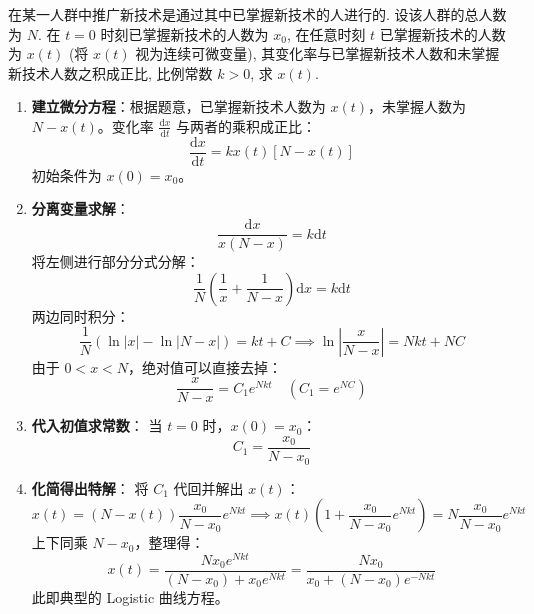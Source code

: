 \documentclass[lang=cn,11pt]{elegantbook}
\begin{document}
\begin{exercise}
在某一人群中推广新技术是通过其中已掌握新技术的人进行的. 设该人群的总人数为 $N$. 在 $t=0$ 时刻已掌握新技术的人数为 $x_0$, 在任意时刻 $t$ 已掌握新技术的人数为 $x(t)$ (将 $x(t)$ 视为连续可微变量), 其变化率与已掌握新技术人数和未掌握新技术人数之积成正比, 比例常数 $k>0$, 求 $x(t)$.
\end{exercise}
\begin{solution}
\begin{enumerate}
    \item \textbf{建立微分方程}：根据题意，已掌握新技术人数为 $x(t)$，未掌握人数为 $N - x(t)$。变化率 $\frac{\mathrm{d}x}{\mathrm{d}t}$ 与两者的乘积成正比：
    \[
    \frac{\mathrm{d}x}{\mathrm{d}t} = k x(t) [N - x(t)]
    \]
    初始条件为 $x(0) = x_0$。
    
    \item \textbf{分离变量求解}：
    \[
    \frac{\mathrm{d}x}{x(N-x)} = k \mathrm{d}t
    \]
    将左侧进行部分分式分解：
    \[
    \frac{1}{N} \left( \frac{1}{x} + \frac{1}{N-x} \right) \mathrm{d}x = k \mathrm{d}t
    \]
    两边同时积分：
    \[
    \frac{1}{N} \left( \ln|x| - \ln|N-x| \right) = kt + C \implies \ln \left| \frac{x}{N-x} \right| = Nkt + NC
    \]
    由于 $0 < x < N$，绝对值可以直接去掉：
    \[
    \frac{x}{N-x} = C_1 e^{Nkt} \quad (C_1 = e^{NC})
    \]
    
    \item \textbf{代入初值求常数}：
    当 $t=0$ 时，$x(0) = x_0$：
    \[
    C_1 = \frac{x_0}{N-x_0}
    \]
    
    \item \textbf{化简得出特解}：
    将 $C_1$ 代回并解出 $x(t)$：
    \[
    x(t) = (N-x(t)) \frac{x_0}{N-x_0} e^{Nkt} \implies x(t) \left( 1 + \frac{x_0}{N-x_0} e^{Nkt} \right) = N \frac{x_0}{N-x_0} e^{Nkt}
    \]
    上下同乘 $N-x_0$，整理得：
    \[
    x(t) = \frac{N x_0 e^{Nkt}}{(N-x_0) + x_0 e^{Nkt}} = \frac{N x_0}{x_0 + (N-x_0)e^{-Nkt}}
    \]
    此即典型的 Logistic 曲线方程。
\end{enumerate}
\end{solution}
\end{document}
